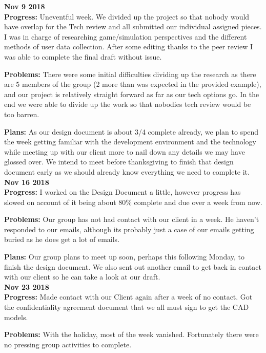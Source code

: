 \textbf{Nov 9 2018}\\
\textbf{Progress:}
Uneventful week. We divided up the project so that nobody would have overlap for the Tech review and all submitted our individual assigned pieces. I was in charge of researching game/simulation perspectives and the different methods of user data collection. After some editing thanks to the peer review I was able to complete the final draft without issue.


\textbf{Problems:}
There were some initial difficulties dividing up the research as there are 5 members of the group (2 more than was expected in the provided example), and our project is relatively straight forward as far as our tech options go. In the end we were able to divide up the work so that nobodies tech review would be too barren.


\textbf{Plans:} 
As our design document is about 3/4 complete already, we plan to spend the week getting familiar with the development environment and the technology while meeting up with our client more to nail down any details we may have glossed over. We intend to meet before thanksgiving to finish that design document early as we should already know everything we need to complete it.\\

\textbf{Nov 16 2018}\\
\textbf{Progress:}
I worked on the Design Document a little, however progress has slowed on account of it being about 80\% complete and due over a week from now.


\textbf{Problems:}
Our group has not had contact with our client in a week. He haven't responded to our emails, although its probably just a case of our emails getting buried as he does get a lot of emails. 


\textbf{Plans:}
Our group plans to meet up soon, perhaps this following Monday, to finish the design document. We also sent out another email to get back in contact with our client so he can take a look at our draft. \\

\textbf{Nov 23 2018}\\
\textbf{Progress:}
Made contact with our Client again after a week of no contact. Got the confidentiality agreement document that we all must sign to get the CAD models.

\textbf{Problems:} 
With the holiday, most of the week vanished. Fortunately there were no pressing group activities to complete.

